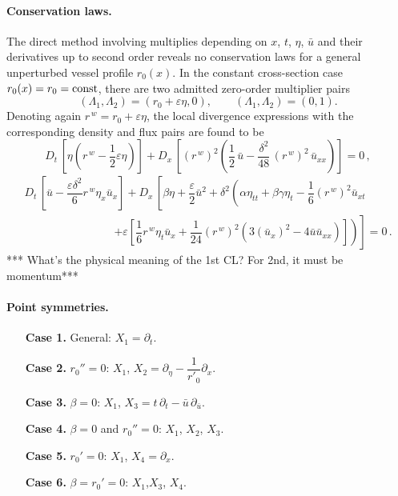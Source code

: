 \documentclass[alpha-refs, 12pt]{wiley-article}
\newcommand{\eps}{\varepsilon}
\begin{document}
\paragraph{Conservation laws.} The direct method involving multiplies depending on $x$, $t$, $\eta$, $\bar{u}$ and their derivatives up to second order reveals no conservation laws for a general unperturbed vessel profile $r_0(x)$. In the constant cross-section case $r_0(x)=r_0=\rm const$, there are two admitted zero-order multiplier pairs
\[
(\Lambda_1,\Lambda_2)=(r_0+\eps \eta, 0), \qquad (\Lambda_1,\Lambda_2)=(0,1).
\]
Denoting again $r^{\,w}=r_0+\eps \eta$, the local divergence expressions with the corresponding density and flux pairs are found to be
\begin{equation}\label{eq:SGN:CL:1}
  D_{t}\,\left[\eta \left(r^{\,w}-\frac{1}{2}\eps \eta\right)\right]
  + D_{x}\,\left[(r^{\,w})^2 \left(\frac{1}{2}\,\bar{u}  -\frac{\delta^2}{48}\,(r^{\,w})^2\,\bar{u}_{xx}\right) \right]=0\,,
\end{equation}
\begin{equation}\label{eq:SGN:CL:2}
\begin{array}{ll}
  D_{t}\,\left[\bar{u} - \dfrac{\eps \delta^2}{6}r^{\,w} \eta_x\bar{u}_x  \right]
  + D_{x}\,\left[
    \beta \eta + \dfrac{\eps}{2}\bar{u}^2 + \delta^2 \left(
          \alpha \eta_{tt} + \beta\gamma \eta_t  - \dfrac{1}{6}(r^{\,w})^2 \bar{u}_{xt} \right.\right.\\[2ex]
          \qquad \qquad \qquad \qquad \left.\left.
           +  \eps\left[
                \dfrac{1}{6} r^{\,w} \eta_t \bar{u}_{x} + \dfrac{1}{24}(r^{\,w})^2 (3(\bar{u}_{x})^2 - 4\bar{u}\bar{u}_{xx} )
              \right]
    \right)
  \right]=0\,.
\end{array}
\end{equation}
{\color{red}*** What's the physical meaning of the 1st CL? For 2nd, it must be momentum***}


\paragraph{Point symmetries.}
\begin{itemize}
  \item[\textbf{Case 1.}]
    General:\;
    $X_{1}=\partial_{t}$.
  \item[\textbf{Case 2.}]
    $r_{0}''=0$:\;
    $X_{1}$, $X_{2}=\partial_{\eta}-\dfrac{1}{r'_{0}}\partial_{x}$.
  \item[\textbf{Case 3.}]
    $\beta=0$:\;
    $X_{1}$,\;  $X_{3}=t\,\partial_{t} - \bar{u}\,\partial_{\bar{u}}$.
  \item[\textbf{Case 4.}]
    $\beta=0$ and $r_{0}''=0$:\;
    $X_{1}$, $X_{2}$,\; $X_{3}$.
  \item[\textbf{Case 5.}]
    $r_{0}'=0$:\;
    $X_{1}$, $X_{4}=\partial_{x}$.
  \item[\textbf{Case 6.}]
    $\beta=r_{0}'=0$:\;
    $X_{1}$,\;$X_{3}$,\; $X_{4}$.
  \end{itemize}
\end{document}
